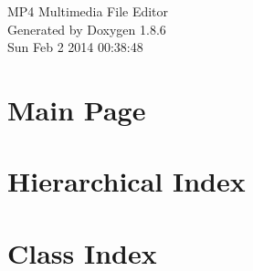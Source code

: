 \documentclass[twoside]{book}
\newcommand{\clearemptydoublepage}{%
  \newpage{\pagestyle{empty}\cleardoublepage}%
}
\begin{document}
\hypersetup{pageanchor=false}
\begin{titlepage}
\vspace*{7cm}
\begin{center}%
{\Large M\-P4 Multimedia File Editor }\\
\vspace*{1cm}
{\large Generated by Doxygen 1.8.6}\\
\vspace*{0.5cm}
{\small Sun Feb 2 2014 00:38:48}\\
\end{center}
\end{titlepage}
\clearemptydoublepage
\tableofcontents
\clearemptydoublepage
{}
\hypersetup{pageanchor=true}

\chapter{Main Page}
\label{index}\hypertarget{index}{}
\chapter{Hierarchical Index}

\chapter{Class Index}

\end{document}
